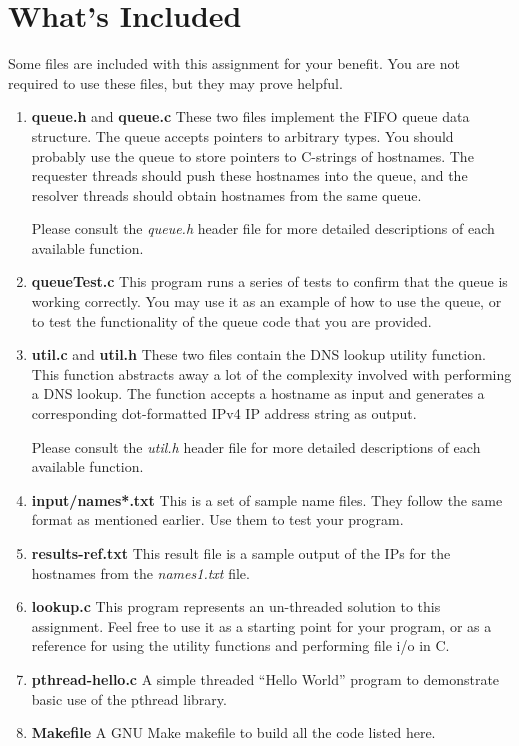 \documentclass[12pt]{article}
\begin{document}
\section{What's Included}
Some files are included with this assignment for your benefit. You are
not required to use these files, but they may prove helpful.
\begin{enumerate}
\item {\bf queue.h} and {\bf queue.c} These two files implement the
  FIFO queue data structure. The queue accepts pointers to arbitrary
  types. You should probably use the queue to store pointers to
  C-strings of hostnames. The requester threads should push these
  hostnames into the
  queue, and the resolver threads should obtain hostnames from the same
  queue.

  Please consult the \textit{queue.h} header file for more detailed
  descriptions of each available function.

\item {\bf queueTest.c} This program runs a series of tests to confirm
  that the queue is working correctly. You may use it as an example of
  how to use the queue, or to test the functionality of the queue code
  that you are provided.

\item {\bf util.c} and {\bf util.h} These two files contain the DNS lookup
  utility function. This function abstracts away a lot of the
  complexity involved with performing a DNS lookup. The function
  accepts a hostname as input and generates a corresponding
  dot-formatted IPv4 IP address string as output.
  
  Please consult the \textit{util.h} header file for more detailed
  descriptions of each available function.
  
\item {\bf input/names*.txt} This is a set of sample name files.
  They follow the same format as mentioned earlier. Use them to test
  your program.

\item {\bf results-ref.txt} This result file is a sample output of the IPs
  for the hostnames from the \textit{names1.txt} file.

\item {\bf lookup.c} This program represents an un-threaded solution to
  this assignment. Feel free to use it as a starting point for your
  program, or as a reference for using the utility functions and
  performing file i/o in C.

\item {\bf pthread-hello.c} A simple threaded ``Hello World'' program
  to demonstrate basic use of the pthread library.

\item {\bf Makefile} A GNU Make makefile to build all the code listed
  here.

\end{enumerate}
\end{document}
